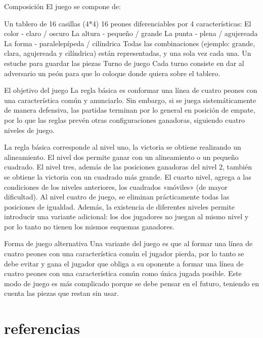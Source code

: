 \documentclass[
  letterpaper,
  letterpaper,
  twocolumn]{./tex/tesisIER}
\begin{document}
Composición El juego se compone de:

Un tablero de 16 casillas (4*4) 16 peones diferenciables por 4
características: El color - claro / oscuro La altura - pequeño / grande
La punta - plena / agujereada La forma - paralelepípeda / cilíndrica
Todas las combinaciones (ejemplo: grande, clara, agujereada y
cilíndrica) están representadas, y una sola vez cada una. Un estuche
para guardar las piezas Turno de juego Cada turno consiste en dar al
adversario un peón para que lo coloque donde quiera sobre el tablero.

El objetivo del juego La regla básica es conformar una línea de cuatro
peones con una característica común y anunciarlo. Sin embargo, si se
juega sistemáticamente de manera defensiva, las partidas terminan por lo
general en posición de empate, por lo que las reglas prevén otras
configuraciones ganadoras, siguiendo cuatro niveles de juego.

La regla básica corresponde al nivel uno, la victoria se obtiene
realizando un alineamiento. El nivel dos permite ganar con un
alineamiento o un pequeño cuadrado. El nivel tres, además de las
posiciones ganadoras del nivel 2, también se obtiene la victoria con un
cuadrado más grande. El cuarto nivel, agrega a las condiciones de los
niveles anteriores, los cuadrados «móviles» (de mayor dificultad). Al
nivel cuatro de juego, se eliminan prácticamente todas las posiciones de
igualdad. Además, la existencia de diferentes niveles permite introducir
una variante adicional: los dos jugadores no juegan al mismo nivel y por
lo tanto no tienen los mismos esquemas ganadores.

Forma de juego alternativa Una variante del juego es que al formar una
línea de cuatro peones con una característica común el jugador pierda,
por lo tanto se debe evitar y gana el jugador que obliga a su oponente a
formar una línea de cuatro peones con una característica común como
única jugada posible. Este modo de juego es más complicado porque se
debe pensar en el futuro, teniendo en cuenta las piezas que restan sin
usar.


\hypertarget{referencias}{%
\chapter{referencias}\label{referencias}}
\end{document}
